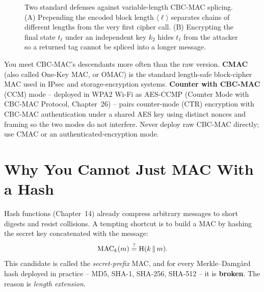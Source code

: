 \begin{figure}[htbp]
\caption{Two standard defenses against variable-length CBC-MAC splicing. (A) Prepending the encoded block length $\langle\ell\rangle$ separates chains of different lengths from the very first cipher call. (B) Encrypting the final state $t_\ell$ under an independent key $k_2$ hides $t_\ell$ from the attacker so a returned tag cannot be spliced into a longer message.}
\label{ch15:fig-cbcmac-fixes}
\end{figure}

\begin{applicationbox}
You meet CBC-MAC's descendants more often than the raw version. \textbf{CMAC} (also called One-Key MAC, or OMAC) is the standard length-safe block-cipher MAC used in IPsec and storage-encryption systems. \textbf{Counter with CBC-MAC} (CCM) mode -- deployed in WPA2 Wi-Fi as AES-CCMP (Counter Mode with CBC-MAC Protocol, Chapter~26) -- pairs counter-mode (CTR) encryption with CBC-MAC authentication under a shared AES key using distinct nonces and framing so the two modes do not interfere. Never deploy raw CBC-MAC directly; use CMAC or an authenticated-encryption mode.
\end{applicationbox}

\section{Why You Cannot Just MAC With a Hash}
\label{ch15:length-extension}

Hash functions (Chapter~14) already compress arbitrary messages to short digests and resist collisions. A tempting shortcut is to build a MAC by hashing the secret key concatenated with the message:
\[
  \operatorname{MAC}_k(m) \stackrel{?}{=} \operatorname{H}(k \,\|\, m).
\]
This candidate is called the \emph{secret-prefix} MAC, and for every Merkle--Damg\aa{}rd hash deployed in practice -- MD5, SHA-1, SHA-256, SHA-512 -- it is \textbf{broken}. The reason is \emph{length extension}.

